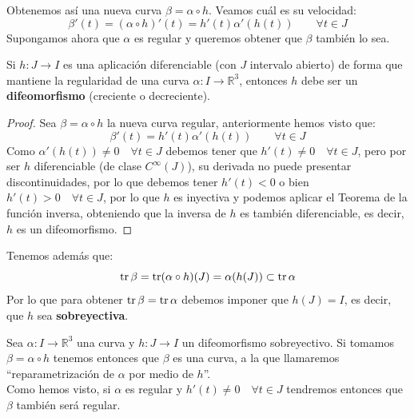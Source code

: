 \noindent
Obtenemos así una nueva curva $\beta = \alpha\circ h$. Veamos cuál es su velocidad:
\begin{equation*}
    \beta'(t) = (\alpha\circ h)'(t) = h'(t)\alpha'(h(t))  \qquad \forall t\in J
\end{equation*}
Supongamos ahora que $\alpha$ es regular y queremos obtener que $\beta$ también lo sea.

\begin{observacion}
    Si $h:J\to I$ es una aplicación diferenciable (con $J$ intervalo abierto) de forma que mantiene la regularidad de una curva $\alpha:I\to\mathbb{R}^3$, entonces $h$ debe ser un \textbf{difeomorfismo} (creciente o decreciente).
    \begin{proof}
        Sea $\beta = \alpha\circ h$ la nueva curva regular, anteriormente hemos visto que:
        \begin{equation*}
            \beta'(t) = h'(t)\alpha'(h(t)) \qquad \forall t\in J
        \end{equation*}
        Como $\alpha'(h(t))\neq 0 \quad \forall t\in J$ debemos tener que $h'(t)\neq 0 \quad \forall t\in J$, pero por ser $h$ diferenciable (de clase $C^\infty(J)$), su derivada no puede presentar discontinuidades, por lo que debemos tener $h'(t)<0$ o bien $h'(t)>0\quad \forall t\in J$, por lo que $h$ es inyectiva y podemos aplicar el Teorema de la función inversa, obteniendo que la inversa de $h$  es también diferenciable, es decir, $h$ es un difeomorfismo.
    \end{proof}
\end{observacion}

\noindent
Tenemos además que:
\begin{equation*}
    \operatorname{tr} \beta = \operatorname{tr} (\alpha\circ h)(J) = \alpha(h(J)) \subset \operatorname{tr} \alpha
\end{equation*}
Por lo que para obtener $\operatorname{tr} \beta = \operatorname{tr} \alpha$ debemos imponer que $h(J) = I$, es decir, que $h$ sea \textbf{sobreyectiva}.

\begin{definicion}[Reparametrización]
    Sea $\alpha:I\to\mathbb{R}^3$ una curva y $h:J\to I$ un difeomorfismo sobreyectivo. Si tomamos $\beta = \alpha\circ h$ tenemos entonces que $\beta$ es una curva, a la que llamaremos ``reparametrización de $\alpha$ por medio de $h$''.\\

    \noindent
    Como hemos visto, si $\alpha$ es regular y $h'(t)\neq 0 \quad \forall t\in J$ tendremos entonces que $\beta$ también será regular.
\end{definicion}

